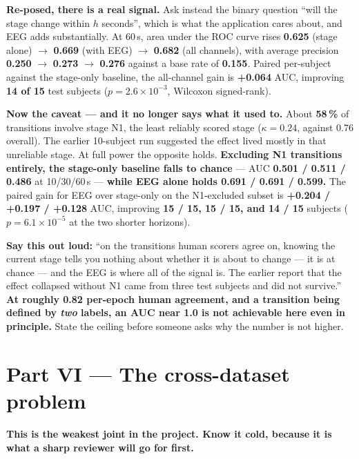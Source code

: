 \documentclass[11pt]{article}
\begin{document}
\textbf{Re-posed, there is a real signal.} Ask instead the binary question ``will
the stage change within $h$ seconds'', which is what the application cares about,
and EEG adds substantially. At 60\,s, area under the ROC curve rises
\textbf{0.625} (stage alone) $\rightarrow$ \textbf{0.669} (with EEG)
$\rightarrow$ \textbf{0.682} (all channels), with average precision
\textbf{0.250} $\rightarrow$ \textbf{0.273} $\rightarrow$ \textbf{0.276} against a
base rate of \textbf{0.155}. Paired per-subject against the stage-only baseline,
the all-channel gain is \textbf{+0.064} AUC, improving \textbf{14 of 15} test
subjects ($p = 2.6\times10^{-3}$, Wilcoxon signed-rank).

\textbf{Now the caveat --- and it no longer says what it used to.} About
\textbf{58\,\%} of transitions involve stage N1, the least reliably scored stage
($\kappa = 0.24$, against $0.76$ overall). The earlier 10-subject run suggested
the effect lived mostly in that unreliable stage. At full power the opposite
holds. \textbf{Excluding N1 transitions entirely, the stage-only baseline falls to
chance} --- AUC \textbf{0.501 / 0.511 / 0.486} at 10/30/60\,s --- \textbf{while
EEG alone holds 0.691 / 0.691 / 0.599.} The paired gain for EEG over stage-only on
the N1-excluded subset is \textbf{+0.204 / +0.197 / +0.128} AUC, improving
\textbf{15 / 15, 15 / 15, and 14 / 15} subjects ($p = 6.1\times10^{-5}$ at the two
shorter horizons).

\begin{keybox}
\textbf{Say this out loud:} ``on the transitions human scorers agree on, knowing
the current stage tells you nothing about whether it is about to change --- it is
at chance --- and the EEG is where all of the signal is. The earlier report that
the effect collapsed without N1 came from three test subjects and did not
survive.'' \textbf{At roughly 0.82 per-epoch human agreement, and a transition
being defined by \emph{two} labels, an AUC near 1.0 is not achievable here even in
principle.} State the ceiling before someone asks why the number is not higher.
\end{keybox}

\section{Part VI --- The cross-dataset problem}

\textbf{This is the weakest joint in the project. Know it cold, because it is
what a sharp reviewer will go for first.}
\end{document}
